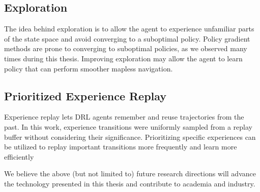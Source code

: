 \subsection{Exploration}
The idea behind exploration is to allow the agent to experience unfamiliar parts of the state space and avoid converging to a suboptimal policy. Policy gradient methods are prone to converging to suboptimal policies, as we observed many times during this thesis. Improving exploration may allow the agent to learn policy that can perform smoother mapless navigation.

\subsection{Prioritized Experience Replay}
Experience replay lets DRL agents remember and reuse trajectories from the past. In this work, experience transitions were uniformly sampled from a replay buffer without considering their significance. Prioritizing specific experiences can be utilized to replay important transitions more frequently and learn more efficiently~\cite{schaul_prioritized_2016}

\vspace{2em}
We believe the above (but not limited to) future research directions will advance the technology presented in this thesis and contribute to academia and industry.
